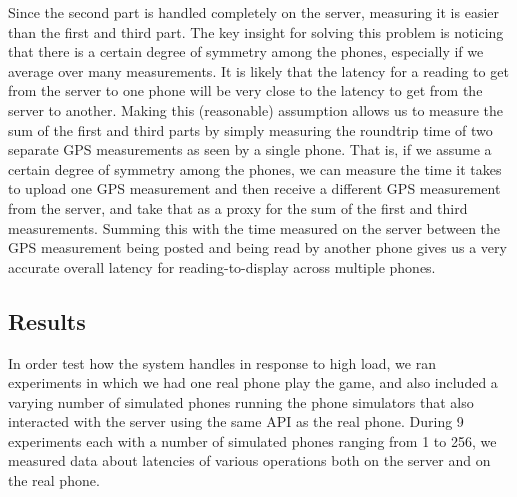\documentclass{acm_proc_article-sp}
\begin{document}
Since the second part is handled completely on the server, measuring
it is easier than the first and third part.  The key insight for
solving this problem is noticing that there is a certain degree of
symmetry among the phones, especially if we average over many
measurements.  It is likely that the latency for a reading to get from
the server to one phone will be very close to the latency to get from
the server to another.  Making this (reasonable) assumption allows us
to measure the sum of the first and third parts by simply measuring
the roundtrip time of two separate GPS measurements as seen by a
single phone.  That is, if we assume a certain degree of symmetry
among the phones, we can measure the time it takes to upload one GPS
measurement and then receive a different GPS measurement from the
server, and take that as a proxy for the sum of the first and third
measurements.  Summing this with the time measured on the server
between the GPS measurement being posted and being read by another
phone gives us a very accurate overall latency for reading-to-display
across multiple phones.

\subsection{Results}
In order test how the system handles in response to high load, we ran
experiments in which we had one real phone play the game, and also included
a varying number of simulated phones running the phone simulators that
also interacted with the server using the same API as the real phone.
During 9 experiments each with a number of simulated phones ranging from 1
to 256, we measured data about latencies of various operations both on the
server and on the real phone.
\end{document}
